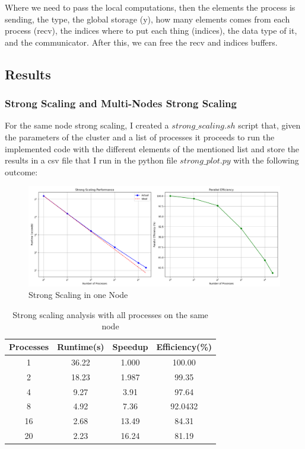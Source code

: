 \documentclass[unicode,11pt,a4paper,oneside,numbers=endperiod,openany]{scrartcl}
\begin{document}
Where we need to pass the local computations, then the elements the process is sending, the type, the global storage (y), how many elements comes from each process (recv),
the indices where to put each thing (indices), the data type of it, and the communicator. After this, we can free the recv and indices buffers. 

\subsection{Results}
\subsubsection{Strong Scaling and Multi-Nodes Strong Scaling}
For the same node strong scaling, I created a $strong\_scaling.sh$ script that, given the parameters of the cluster and a list of processes 
it proceeds to run the implemented code with the different elements of the mentioned list and store the results in a csv file that I run in the 
python file $strong\_plot.py$ with the following outcome: 

\begin{figure}[H]
    \centering
    \includegraphics[width=\textwidth]{./img/exe4/strong_scaling.png}
    \caption{Strong Scaling in one Node}
  \end{figure}

\begin{table}[h!]
\centering
\begin{tabular}{|c|c|c|c|}
\hline
Processes & Runtime(s) & Speedup & Efficiency(\%) \\
\hline
1 & 36.22 & 1.000 & 100.00 \\
2 & 18.23 & 1.987 & 99.35 \\
4 & 9.27 & 3.91 & 97.64 \\
8 & 4.92 & 7.36 & 92.0432 \\
16 & 2.68 & 13.49 & 84.31 \\
20 & 2.23 & 16.24 & 81.19 \\
\hline
\end{tabular}
\caption{Strong scaling analysis with all processes on the same node}
\end{table}
\end{document}
